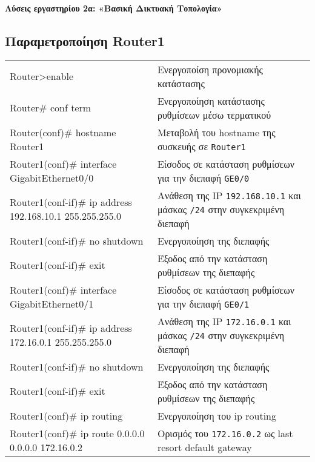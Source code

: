 \documentclass{EdipyLabsSolutions}
\begin{document}
	
\noindent\textbf{\Large Λύσεις εργαστηρίου 2α: «Βασική Δικτυακή Τοπολογία»}
\hrulefill

\subsection*{Παραμετροποίηση Router1}

\begin{tabular}{>{\ttfamily}m{12cm}m{7cm}}
	Router>enable & Ενεργοποίση προνομιακής κατάστασης\\[0.25cm]
	Router\# conf term & Ενεργοποίηση κατάστασης ρυθμίσεων μέσω τερματικού\\[0.25cm]
	Router(conf)\# hostname Router1 & Μεταβολή του hostname της συσκευής σε \texttt{Router1}\\[0.25cm]
	Router1(conf)\# interface GigabitEthernet0/0 & Είσοδος σε κατάσταση ρυθμίσεων για την διεπαφή \texttt{GE0/0}\\[0.25cm]
	Router1(conf-if)\# ip address 192.168.10.1 255.255.255.0 & Ανάθεση της IP \texttt{192.168.10.1} και μάσκας \texttt{/24} στην συγκεκριμένη διεπαφή\\[0.25cm]
	Router1(conf-if)\# no shutdown & Ενεργοποίηση της διεπαφής\\[0.25cm]
	Router1(conf-if)\# exit & Έξοδος από την κατάσταση ρυθμίσεων της διεπαφής\\[0.25cm]
	Router1(conf)\# interface GigabitEthernet0/1 & Είσοδος σε κατάσταση ρυθμίσεων για την διεπαφή \texttt{GE0/1} \\[0.25cm]
	Router1(conf-if)\# ip address 172.16.0.1 255.255.255.0 & Ανάθεση της IP \texttt{172.16.0.1} και μάσκας \texttt{/24} στην συγκεκριμένη διεπαφή\\[0.25cm]
	Router1(conf-if)\# no shutdown & Ενεργοποίηση της διεπαφής\\[0.25cm]
	Router1(conf-if)\# exit & Έξοδος από την κατάσταση ρυθμίσεων της διεπαφής\\[0.25cm]
	Router1(conf)\# ip routing & Ενεργοποίηση του ip routing\\[0.25cm]
	Router1(conf)\# ip route 0.0.0.0 0.0.0.0 172.16.0.2 & Ορισμός του \texttt{172.16.0.2} ως last resort default gateway
\end{tabular}
\end{document}
